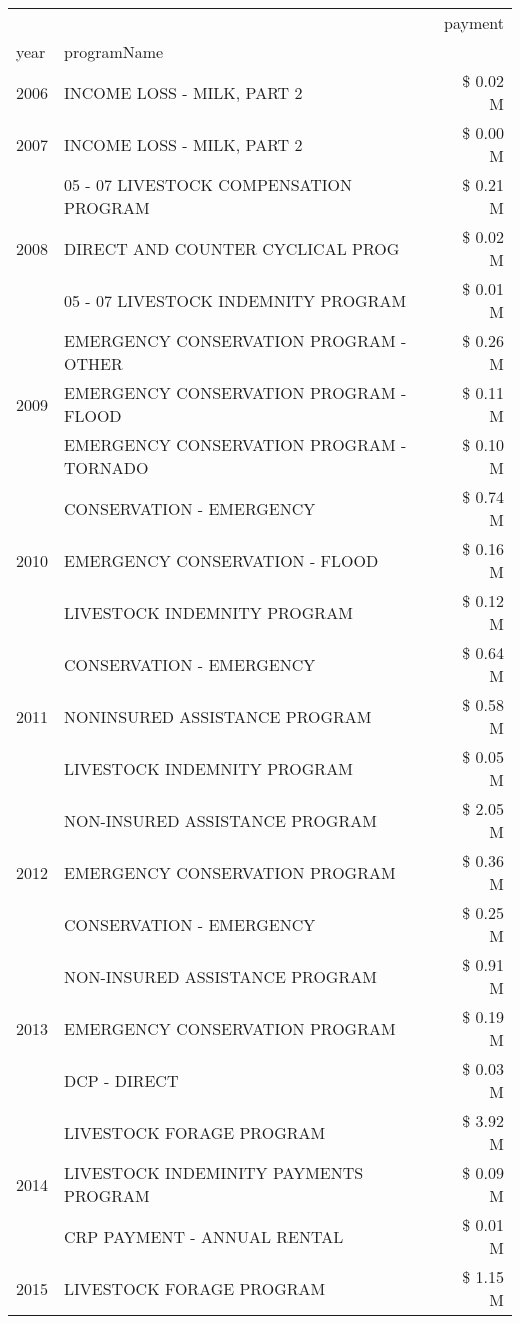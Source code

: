 \begin{tabular}{llr}
\toprule
 &  & payment \\
year & programName &  \\
\midrule
2006 & INCOME LOSS - MILK, PART 2 & \$ 0.02 M \\
\cline{1-3}
2007 & INCOME LOSS - MILK, PART 2 & \$ 0.00 M \\
\cline{1-3}
\multirow[t]{3}{*}{2008} & 05 - 07 LIVESTOCK COMPENSATION PROGRAM & \$ 0.21 M \\
 & DIRECT AND COUNTER CYCLICAL PROG & \$ 0.02 M \\
 & 05 - 07 LIVESTOCK INDEMNITY PROGRAM & \$ 0.01 M \\
\cline{1-3}
\multirow[t]{3}{*}{2009} & EMERGENCY CONSERVATION PROGRAM - OTHER & \$ 0.26 M \\
 & EMERGENCY CONSERVATION PROGRAM - FLOOD & \$ 0.11 M \\
 & EMERGENCY CONSERVATION PROGRAM - TORNADO & \$ 0.10 M \\
\cline{1-3}
\multirow[t]{3}{*}{2010} & CONSERVATION - EMERGENCY & \$ 0.74 M \\
 & EMERGENCY CONSERVATION - FLOOD & \$ 0.16 M \\
 & LIVESTOCK INDEMNITY PROGRAM & \$ 0.12 M \\
\cline{1-3}
\multirow[t]{3}{*}{2011} & CONSERVATION - EMERGENCY & \$ 0.64 M \\
 & NONINSURED ASSISTANCE PROGRAM & \$ 0.58 M \\
 & LIVESTOCK INDEMNITY PROGRAM & \$ 0.05 M \\
\cline{1-3}
\multirow[t]{3}{*}{2012} & NON-INSURED ASSISTANCE PROGRAM & \$ 2.05 M \\
 & EMERGENCY CONSERVATION PROGRAM & \$ 0.36 M \\
 & CONSERVATION - EMERGENCY & \$ 0.25 M \\
\cline{1-3}
\multirow[t]{3}{*}{2013} & NON-INSURED ASSISTANCE PROGRAM & \$ 0.91 M \\
 & EMERGENCY CONSERVATION PROGRAM & \$ 0.19 M \\
 & DCP - DIRECT & \$ 0.03 M \\
\cline{1-3}
\multirow[t]{3}{*}{2014} & LIVESTOCK FORAGE PROGRAM & \$ 3.92 M \\
 & LIVESTOCK INDEMINITY PAYMENTS PROGRAM & \$ 0.09 M \\
 & CRP PAYMENT - ANNUAL RENTAL & \$ 0.01 M \\
\cline{1-3}
\multirow[t]{3}{*}{2015} & LIVESTOCK FORAGE PROGRAM & \$ 1.15 M \\

\end{tabular}
